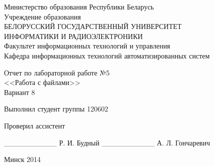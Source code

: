 \thispagestyle{empty}
\setlength{\parindent}{0ex} %

\begin{center}
  Министерство образования Республики Беларусь \\
  \smallskip
  Учреждение образования \\
  БЕЛОРУССКИЙ ГОСУДАРСТВЕННЫЙ УНИВЕРСИТЕТ \\
  ИНФОРМАТИКИ И РАДИОЭЛЕКТРОНИКИ \\
  \smallskip
  Факультет информационных технологий и управления \\
  \smallskip
  Кафедра информационных технологий автоматизированных систем
\end{center}

\vspace{50mm}

\begin{center}
  Отчет по лабораторной работе №5 \\
  <<Работа с файлами>> \\
  Вариант 8
\end{center}

\vspace{45mm}

\begin{minipage}{.55\linewidth}
  Выполнил студент группы 120602

  \smallskip

  Проверил ассистент
\end{minipage}
\hfill
\begin{minipage}{.4\linewidth}
  \begin{flushright}
    \_\_\_\_\_\_\_\_\_\_ Р. И. Будный
    \smallskip
    \_\_\_\_\_\_\_\_\_\_ А. Л. Гончаревич
  \end{flushright}
\end{minipage}

\vspace{60mm}
\begin{center}
  Минск 2014
\end{center}

\setlength{\parindent}{5ex} %